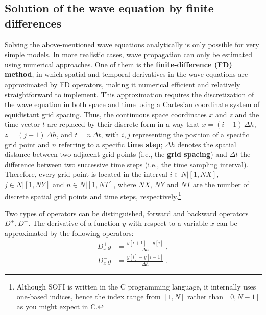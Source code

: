 \subsection{Solution of the wave equation by finite differences}
\label{elastic_FD_Code}
Solving the above-mentioned wave equations analytically is only possible for very simple models. In more realistic cases, wave propagation can only be estimated using numerical approaches. One of them is the \textbf{finite-difference (FD) method}, in which spatial and temporal derivatives in the wave equations are approximated by FD operators, making it numerical efficient and relatively straightforward to implement. This approximation requires the discretization of the wave equation in both space and time using a Cartesian coordinate system of equidistant grid spacing. Thus, the continuous space coordinates $x$ and $z$ and the time vector $t$ are replaced by their discrete form in a way that $x = (i-1)\,\Delta h$, $z = (j-1)\,\Delta h$, and $t = n\,\Delta t$, with $i,j$ representing the position of a specific grid point and $n$ referring to a specific \textbf{time step}; $\Delta h$ denotes the spatial distance between two adjacent grid points (i.e., the \textbf{grid spacing}) and $\Delta t$ the difference between two successive time steps (i.e., the time sampling interval). Therefore, every grid point is located in the interval  $i \in N | [1,NX]$, $j \in N | [1,NY]$ and $n \in N | [1,NT]$, where $NX$, $NY$ and $NT$ are the number of discrete spatial grid points and time steps, respectively.\footnote{Although SOFI is written in the C programming language, it internally uses one-based indices, hence the index range from $[1,N]$ rather than $[0,N-1]$ as you might expect in C.}

Two types of operators can be distinguished, forward and backward operators $D^+,D^-$. The derivative of a function $y$ with respect to a variable $x$ can be approximated by the following operators:  
\begin{subequations}
    \begin{align}
        {D^+_x} y &= \frac{y{[i+1]} - {y[i]}}{\Delta h}\;,\\
        {D^-_x} y &= \frac{y{[i]}-y{[i-1]}}{\Delta h}\;.
    \end{align}
    \label{eq:3}
\end{subequations}

